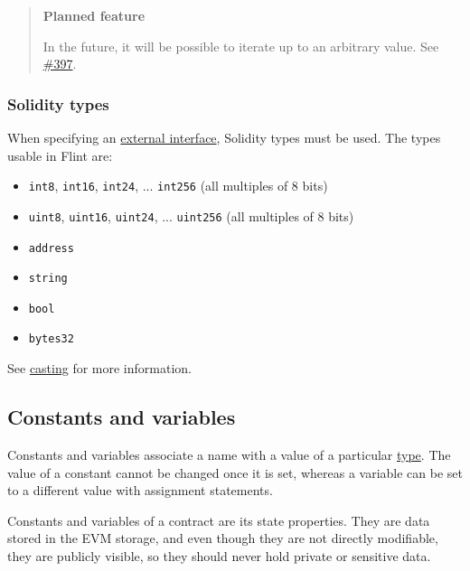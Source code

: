 \begin{quote}
\textbf{Planned feature}

In the future, it will be possible to iterate up to an arbitrary value. See \href{https://github.com/flintlang/flint/issues/397}{\#397}.
\end{quote}

\subsubsection{Solidity types}
\label{sec:appendix-b-solidity-types}

When specifying an \hyperref[sec:appendix-b-external-calls]{external interface}, Solidity types must be used. The types usable in Flint are:

\begin{itemize}
	\item \texttt{int8}, \texttt{int16}, \texttt{int24}, ... \texttt{int256} (all multiples of 8 bits)
	\item \texttt{uint8}, \texttt{uint16}, \texttt{uint24}, ... \texttt{uint256} (all multiples of 8 bits)
	\item \texttt{address}
	\item \texttt{string}
	\item \texttt{bool}
	\item \texttt{bytes32}
\end{itemize}

See \hyperref[sec:appendix-b-casting-to-and-from-solidity-types]{casting} for more information.

\subsection{Constants and variables}
\label{sec:appendix-b-constants-and-variables}

Constants and variables associate a name with a value of a particular \hyperref[sec:appendix-b-types]{type}. The value of a constant cannot be changed once it is set, whereas a variable can be set to a different value with assignment statements.

Constants and variables of a contract are its state properties. They are data stored in the EVM storage, and even though they are not directly modifiable, they are publicly visible, so they should never hold private or sensitive data.

